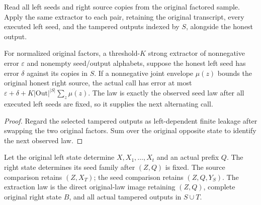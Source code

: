 \begin{definition}
  \label{def:lowerbounds-algebraic-alternating-copies}
  \leanok
  Read all left seeds and right source copies from the original factored
  sample. Apply the same extractor to each pair, retaining the original
  transcript, every executed left seed, and the tampered outputs indexed
  by $S$, alongside the honest output.
\end{definition}

\begin{theorem}
  \label{thm:lowerbounds-algebraic-alternating-copies}
  \leanok
  For normalized original factors, a threshold-$K$ strong extractor of
  nonnegative error $\varepsilon$ and nonempty seed/output alphabets,
  suppose the honest left seed has error $\delta$ against its copies in
  $S$. If a nonnegative joint envelope $\mu(z)$ bounds the original
  honest right source, the actual call has error at most
  $\varepsilon+\delta+K|\mathrm{Out}|^{|S|}\sum_z\mu(z)$.
  The law is exactly the observed seed law after all executed left seeds
  are fixed, so it supplies the next alternating call.
\end{theorem}
\begin{proof}
  \leanok
  Regard the selected tampered outputs as left-dependent finite leakage
  after swapping the two original factors. Sum over the original opposite
  state to identify the next observed law.
\end{proof}

\begin{definition}
  \label{def:lowerbounds-algebraic-smooth-independence}
  \leanok
  Let the original left state determine $X,X_1,\ldots,X_t$ and an actual
  prefix $Q$. The right state determines its seed family after $(Z,Q)$ is
  fixed. The source comparison retains $(Z,X_T)$; the seed comparison
  retains $(Z,Q,Y_S)$. The extraction law is the direct original-law image
  retaining $(Z,Q)$, complete original right state $B$, and all actual
  tampered outputs in $S\cup T$.
\end{definition}


